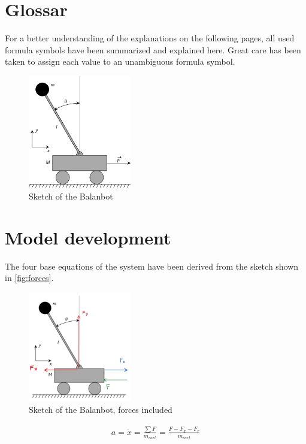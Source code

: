 \section{Glossar}
For a better understanding of the explanations on the following pages, all used formula symbols have been summarized and explained here. Great care has been taken to assign each value to an unambiguous formula symbol.
\begin{figure}[H]
    \centering
    \includegraphics[width=0.4\textwidth]{Lab_report/pics/modelBuilding/300px-Cart-pendulum.svg.png}
    \caption{Sketch of the Balanbot}
    \label{fig:balanbot_sketch}
\end{figure}


\section{Model development}
The four base equations of the system have been derived from the sketch shown in \autoref{fig:forces}.

\begin{figure}[H]
    \centering
    \includegraphics[width=0.4\textwidth]{Lab_report/pics/modelBuilding/forces.png}
    \caption{Sketch of the Balanbot, forces included}
    \label{fig:forces}
\end{figure}

    \begin{align}    \label{eq: base 1 (a)}
        a = \ddot{x} = \frac{\sum F}{m_{cart}} = \frac{F-F_x-F_r}{m_{cart}}
    \end{align}

